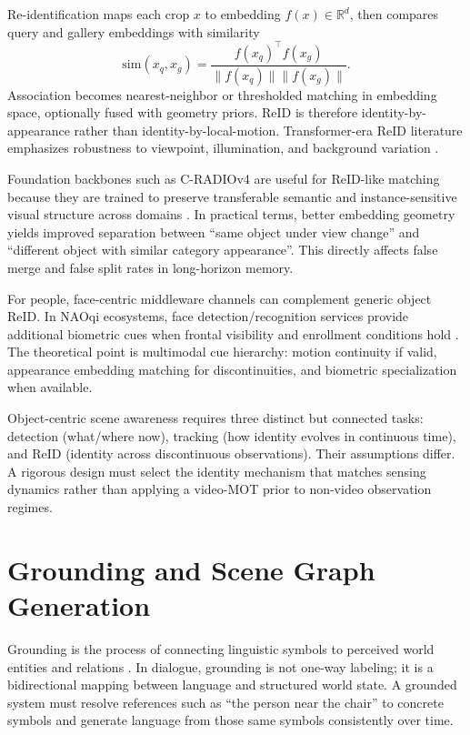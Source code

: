     Re-identification maps each crop \(x\) to embedding \(f(x)\in\mathbb{R}^d\), then compares query and gallery embeddings with similarity
  \[
  \mathrm{sim}(x_q,x_g)=\frac{f(x_q)^\top f(x_g)}{\|f(x_q)\|\|f(x_g)\|}.
  \]
  Association becomes nearest-neighbor or thresholded matching in embedding space, optionally fused with geometry priors. ReID is therefore identity-by-appearance rather than identity-by-local-motion.
  Transformer-era ReID literature emphasizes robustness to viewpoint, illumination, and background variation \cite{ye_transformer_2024}.

    Foundation backbones such as C-RADIOv4 are useful for ReID-like matching because they are trained to preserve transferable semantic and instance-sensitive visual structure across domains
  \cite{ranzinger2026cradiov4techreport}. In practical terms, better embedding geometry yields improved separation between \enquote{same object under view change} and \enquote{different object with
  similar category appearance}. This directly affects false merge and false split rates in long-horizon memory.

    For people, face-centric middleware channels can complement generic object ReID. In NAOqi ecosystems, face detection/recognition services provide additional biometric cues when frontal visibility and
  enrollment conditions hold \cite{softbank_python_sdk_2026}. The theoretical point is multimodal cue hierarchy: motion continuity if valid, appearance embedding matching for discontinuities, and
  biometric specialization when available.

    Object-centric scene awareness requires three distinct but connected tasks: detection (what/where now), tracking (how identity evolves in continuous time), and ReID (identity across discontinuous
  observations). Their assumptions differ. A rigorous design must select the identity mechanism that matches sensing dynamics rather than applying a video-MOT prior to non-video observation regimes.

  \section{Grounding and Scene Graph Generation}

  Grounding is the process of connecting linguistic symbols to perceived world entities and relations \cite{lemaignan_grounding_2012}. In dialogue, grounding is not one-way labeling; it is a
  bidirectional mapping between language and structured world state. A grounded system must resolve references such as \enquote{the person near the chair} to concrete symbols and generate language from
  those same symbols consistently over time.

